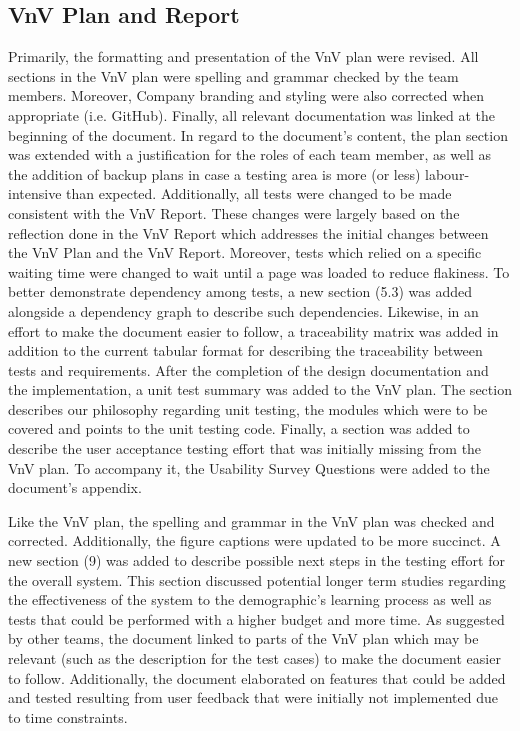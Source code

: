 \documentclass[12pt, titlepage]{article}
\begin{document}
\subsection{VnV Plan and Report}
Primarily, the formatting and presentation of the VnV plan were revised. All sections in the VnV plan were spelling and grammar checked by the team members. Moreover, Company branding and styling were also corrected when appropriate (i.e. GitHub). Finally, all relevant documentation was linked at the beginning of the document. In regard to the document's content, the plan section was extended with a justification for the roles of each team member, as well as the addition of backup plans in case a testing area is more (or less) labour-intensive than expected. Additionally, all tests were changed to be made consistent with the VnV Report. These changes were largely based on the reflection done in the VnV Report which addresses the initial changes between the VnV Plan and the VnV Report. Moreover, tests which relied on a specific waiting time were changed to wait until a page was loaded to reduce flakiness. To better demonstrate dependency among tests, a new section (5.3) was added alongside a dependency graph to describe such dependencies. Likewise, in an effort to make the document easier to follow, a traceability matrix was added in addition to the current tabular format for describing the traceability between tests and requirements. After the completion of the design documentation and the implementation, a unit test summary was added to the VnV plan. The section describes our philosophy regarding unit testing, the modules which were to be covered and points to the unit testing code. Finally, a section was added to describe the user acceptance testing effort that was initially missing from the VnV plan. To accompany it, the Usability Survey Questions were added to the document's appendix.

Like the VnV plan, the spelling and grammar in the VnV plan was checked and corrected. Additionally, the figure captions were updated to be more succinct. A new section (9) was added to describe possible next steps in the testing effort for the overall system. This section discussed potential longer term studies regarding the effectiveness of the system to the demographic's learning process as well as tests that could be performed with a higher budget and more time. As suggested by other teams, the document linked to parts of the VnV plan which may be relevant (such as the description for the test cases) to make the document easier to follow. Additionally, the document elaborated on features that could be added and tested resulting from user feedback that were initially not implemented due to time constraints.
\end{document}
